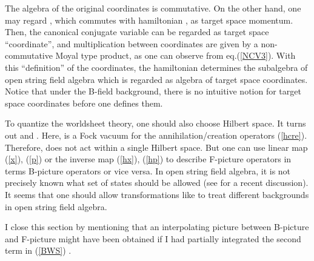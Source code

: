 \documentclass[a4paper,12pt]{article}
\def\bra{\langle}
\def\ket{\rangle}
\begin{document}

The algebra of the original coordinates
\coordHE{} is commutative. 
On the other hand,
one may regard
\coordHE{}, which commutes with hamiltonian 
\coordHE{}, 
as target space momentum.
Then, the
canonical conjugate variable
\coordHE{} can be 
regarded as target space ``coordinate'',
and multiplication between coordinates
are given by a
non-commutative Moyal type product, as one can observe
from eq.(\ref{NCV3}).
With this ``definition'' of the coordinates,
the hamiltonian \coordHE{} determines
the subalgebra
of open string field algebra
which is regarded as algebra of
target space coordinates.
Notice that under the B-field background,
there is no intuitive notion for
target space coordinates before one defines them.


To quantize the worldsheet theory, one should also
choose Hilbert space.
It turns out
\myHighlight{$|\bra \hat{0} | e^N | \hat{0} \ket|^2 = 0$}\coordHE{} and
\myHighlight{$|\bra \hat{0} | e^M | \hat{0} \ket|^2 = 0$}\coordHE{}.
Here, \myHighlight{$| \hat{0} \ket$}\coordHE{} is a Fock vacuum for
the annihilation/creation operators (\ref{hcre}).
Therefore, \coordHE{} does not
 act within a single Hilbert space.
But one can use linear map
(\ref{x}), (\ref{p}) or the inverse map (\ref{hx}), (\ref{hp})
to describe F-picture operators in terms B-picture operators
or vice versa.
In open string field algebra,
it is not precisely known what set of states
should be allowed 
(see \cite{Singular} for a recent discussion).
It seems that
one should allow transformations
like \coordHE{} to treat different
backgrounds in
open string field algebra.



I close this section by mentioning that
an interpolating picture 
between B-picture and F-picture might 
have been obtained
if I had
partially integrated the second term in (\ref{BWS})
\cite{NCSW,Pioline,Wilson}.






\end{document}
